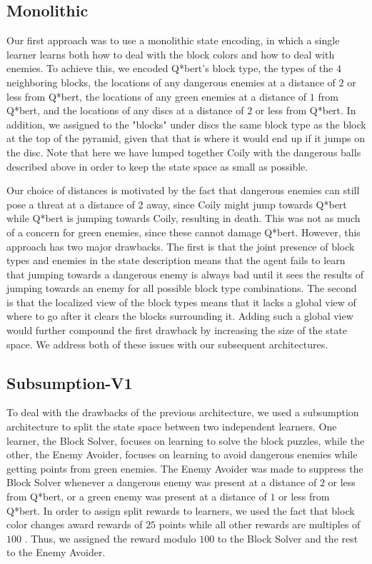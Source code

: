 \documentclass[journal,hidelinks]{IEEEtran}
\begin{document}
\subsection{Monolithic}

Our first approach was to use a monolithic state encoding, in which a single learner learns both how to deal with the block colors and how to deal with enemies. To achieve this, we encoded Q*bert's block type, the types of the $4$ neighboring blocks, the locations of any dangerous enemies at a distance of $2$ or less from Q*bert, the locations of any green enemies at a distance of $1$ from Q*bert, and the locations of any discs at a distance of $2$ or less from Q*bert. In addition, we assigned to the "blocks" under discs the same block type as the block at the top of the pyramid, given that that is where it would end up if it jumps on the disc. Note that here we have lumped together Coily with the dangerous balls described above in order to keep the state space as small as possible.

Our choice of distances is motivated by the fact that dangerous enemies can still pose a threat at a distance of $2$ away, since Coily might jump towards Q*bert while Q*bert is jumping towards Coily, resulting in death. This was not as much of a concern for green enemies, since these cannot damage Q*bert. However, this approach has two major drawbacks. The first is that the joint presence of block types and enemies in the state description means that the agent fails to learn that jumping towards a dangerous enemy is always bad until it sees the results of jumping towards an enemy for all possible block type combinations. The second is that the localized view of the block types means that it lacks a global view of where to go after it clears the blocks surrounding it. Adding such a global view would further compound the first drawback by increasing the size of the state space. We address both of these issues with our subsequent architectures.

\subsection{Subsumption-V1}

To deal with the drawbacks of the previous architecture, we used a subsumption architecture \cite{brooks_robust_1986} to split the state space between two independent learners. One learner, the Block Solver, focuses on learning to solve the block puzzles, while the other, the Enemy Avoider, focuses on learning to avoid dangerous enemies while getting points from green enemies. The Enemy Avoider was made to suppress the Block Solver whenever a dangerous enemy was present at a distance of $2$ or less from Q*bert, or a green enemy was present at a distance of $1$ or less from Q*bert. In order to assign split rewards to learners, we used the fact that block color changes award rewards of $25$ points while all other rewards are multiples of $100$ \cite{greg_chance_atari_1997}. Thus, we assigned the reward modulo $100$ to the Block Solver and the rest to the Enemy Avoider.
\end{document}
